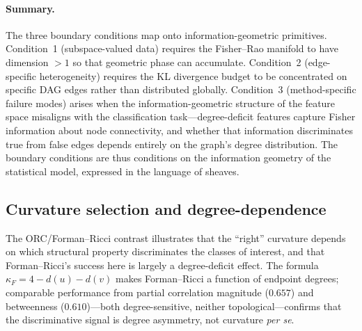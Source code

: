\documentclass[11pt]{article}
\begin{document}
\paragraph{Summary.}
The three boundary conditions map onto information-geometric primitives.
Condition~1 (subspace-valued data) requires the Fisher--Rao manifold to have dimension $> 1$ so that geometric phase can accumulate.
Condition~2 (edge-specific heterogeneity) requires the KL divergence budget to be concentrated on specific DAG edges rather than distributed globally.
Condition~3 (method-specific failure modes) arises when the information-geometric structure of the feature space misaligns with the classification task---degree-deficit features capture Fisher information about node connectivity, and whether that information discriminates true from false edges depends entirely on the graph's degree distribution.
The boundary conditions are thus conditions on the information geometry of the statistical model, expressed in the language of sheaves.

\subsection{Curvature selection and degree-dependence}

The ORC/Forman--Ricci contrast illustrates that the ``right'' curvature depends on which structural property discriminates the classes of interest, and that Forman--Ricci's success here is largely a degree-deficit effect.
The formula $\kappa_F = 4 - d(u) - d(v)$ makes Forman--Ricci a function of endpoint degrees; comparable performance from partial correlation magnitude ($0.657$) and betweenness ($0.610$)---both degree-sensitive, neither topological---confirms that the discriminative signal is degree asymmetry, not curvature \emph{per se}.
\end{document}
